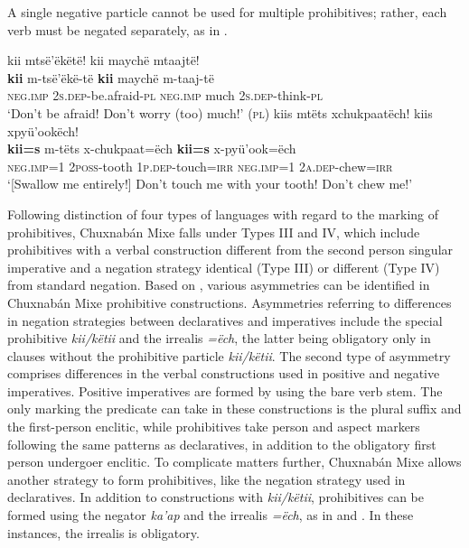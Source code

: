 \documentclass[output=paper,colorlinks,citecolor=brown,draft]{langscibook}
\begin{document}
A single negative particle cannot be used for multiple prohibitives; rather, each verb must be negated separately, as in .

\ea\label{ex:mix:31}
    \ea\label{ex:mix:31a}
        \glll kii mtsë’ëkëtë! kii maychë mtaajtë!\\ 
              \textbf{kii} m-tsë’ëkë-të \textbf{kii} maychë m-taaj-të \\
              \textsc{neg.imp} 2\textsc{s.dep}{}-be.afraid-\textsc{pl} \textsc{neg.imp} much 2\textsc{s.dep}{}-think-\textsc{pl} \\
        \glt ‘Don’t be afraid! Don’t worry (too) much!’ (\textsc{pl})
    \ex\label{ex:mix:31b}
        \glll kiis mtëts xchukpaatëch! kiis xpyü’ookëch!  \\
              \textbf{kii=s} m-tëts x-chukpaat=ëch \textbf{kii=s} x-pyü’ook=ëch \\
              \textsc{neg.imp=1} 2\textsc{poss}{}-tooth \textsc{1p.dep}{}-touch=\textsc{irr} \textsc{neg.imp=1} 2\textsc{a.dep}{}-chew=\textsc{irr} \\
        \glt ‘[Swallow me entirely!] Don’t touch me with your tooth! Don’t chew me!’
    \z
\z 

Following  distinction of four types of languages with regard to the marking of prohibitives, Chuxnabán Mixe falls under Types III and IV, which include prohibitives with a verbal construction different from the second person singular imperative and a negation strategy identical (Type III) or different (Type IV) from standard negation. Based on \citet{MiestamoAuwera2007}, various asymmetries can be identified in Chuxnabán Mixe prohibitive constructions. Asymmetries referring to differences in negation strategies between declaratives and imperatives include the special prohibitive \textit{kii/këtii} and the irrealis \textit{=ëch}, the latter being obligatory only in clauses without the prohibitive particle \textit{kii/këtii}. The second type of asymmetry comprises differences in the verbal constructions used in positive and negative imperatives. Positive imperatives are formed by using the bare verb stem. The only marking the predicate can take in these constructions is the plural suffix and the first-person enclitic, while prohibitives take person and aspect markers following the same patterns as declaratives, in addition to the obligatory first person undergoer enclitic. To complicate matters further, Chuxnabán Mixe allows another strategy to form prohibitives, like the negation strategy used in declaratives. In addition to constructions with \textit{kii/këtii}, prohibitives can be formed using the negator \textit{ka’ap} and the irrealis \textit{=ëch}, as in  and . In these instances, the irrealis is obligatory.
\end{document}
